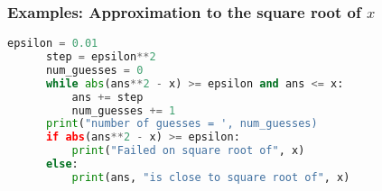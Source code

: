 \documentclass{sintefbeamer}
\begin{document}
\begin{frame}[fragile]
  \frametitle{Examples: Approximation to the square root of $x$}

  \begin{block}{}
    \begin{lstlisting}[language=Python]
      epsilon = 0.01
      step = epsilon**2
      num_guesses = 0
      while abs(ans**2 - x) >= epsilon and ans <= x:
          ans += step
          num_guesses += 1
      print("number of guesses = ', num_guesses)
      if abs(ans**2 - x) >= epsilon:
          print("Failed on square root of", x)
      else:
          print(ans, "is close to square root of", x)
    \end{lstlisting}
  \end{block}

\end{frame}

\backmatter
\end{document}
